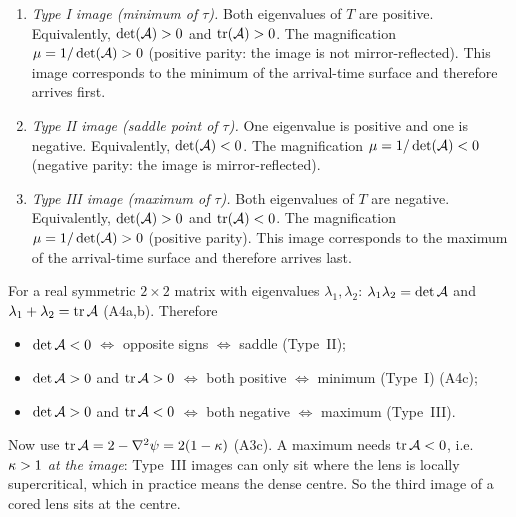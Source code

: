 \begin{enumerate}
    \item \emph{Type I image (minimum of $\tau$).}
    Both eigenvalues of $T$ are positive.  Equivalently,
    $\det(\mathcal{A}) > 0$ and $\mathrm{tr}(\mathcal{A}) > 0$.  The magnification
    $\mu = 1/\det(\mathcal{A}) > 0$ (positive parity: the image is not
    mirror-reflected).  This image corresponds to the minimum
    of the arrival-time surface and therefore arrives first.

    \item \emph{Type II image (saddle point of $\tau$).}
    One eigenvalue is positive and one is negative.  Equivalently,
    $\det(\mathcal{A}) < 0$.  The magnification $\mu = 1/\det(\mathcal{A}) < 0$
    (negative parity: the image is mirror-reflected).

    \item \emph{Type III image (maximum of $\tau$).}
    Both eigenvalues of $T$ are negative.  Equivalently,
    $\det(\mathcal{A}) > 0$ and $\mathrm{tr}(\mathcal{A}) < 0$.  The magnification
    $\mu = 1/\det(\mathcal{A}) > 0$ (positive parity).  This image
    corresponds to the maximum of the arrival-time surface and
    therefore arrives last.
\end{enumerate}

\begin{derivation}
For a real symmetric $2\times2$ matrix with eigenvalues $\lambda_1,\lambda_2$:
$\lambda_1\lambda_2 = \det\mathcal{A}$ and $\lambda_1+\lambda_2 = \mathrm{tr}\,\mathcal{A}$
(A4a,b).  Therefore
\begin{itemize}[nosep]
  \item $\det\mathcal{A}<0$ $\Leftrightarrow$ opposite signs $\Leftrightarrow$ saddle (Type~II);
  \item $\det\mathcal{A}>0$ and $\mathrm{tr}\,\mathcal{A}>0$ $\Leftrightarrow$ both positive
        $\Leftrightarrow$ minimum (Type~I) (A4c);
  \item $\det\mathcal{A}>0$ and $\mathrm{tr}\,\mathcal{A}<0$ $\Leftrightarrow$ both negative
        $\Leftrightarrow$ maximum (Type~III).
\end{itemize}
Now use $\mathrm{tr}\,\mathcal{A} = 2-\nabla^2\psi = 2(1-\kappa)$ (A3c).  A maximum
needs $\mathrm{tr}\,\mathcal{A}<0$, i.e.\ $\kappa>1$ \emph{at the image}: Type~III
images can only sit where the lens is locally supercritical, which in
practice means the dense centre.  So the third image of a cored lens sits
at the centre.
\end{derivation}

